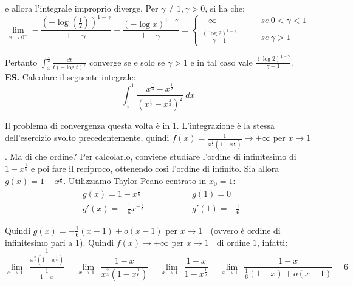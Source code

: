 \documentclass{article}
\begin{document}
\noindent e allora l'integrale improprio diverge. Per $\gamma \neq 1, \gamma > 0$, si ha che:
\begin{equation*}
    \lim_{x \to 0^+} - \frac{(-\log(\frac{1}{2}))^{1 - \gamma}}{1 - \gamma} + \frac{(-\log x)^{1 - \gamma}}{1 - \gamma} = \begin{cases}
        + \infty & \qquad se \ 0 < \gamma < 1 \\
        \frac{(\log 2)^{1 - \gamma}}{\gamma - 1} & \qquad se \ \gamma > 1
    \end{cases}
\end{equation*}

\noindent Pertanto $\int_x^\frac{1}{2} \frac{dt}{t(-\log t)^\gamma}$ converge se e solo se $\gamma > 1$ e in tal caso vale $\frac{(\log 2)^{1 - \gamma}}{\gamma - 1}$.\\

\noindent\textbf{ES.} Calcolare il seguente integrale:
\begin{equation*}
    \int_{\frac{1}{2}}^1 \frac{x^{\frac{1}{3}} - x^{\frac{1}{2}}}{(x^{\frac{1}{2}} - x^{\frac{2}{3}})^2} \ dx
\end{equation*}

\noindent Il problema di convergenza questa volta è in $1$. L'integrazione è la stessa dell'esercizio svolto precedentemente, quindi $f(x) = \frac{1}{x^{\frac{2}{3}} (1 - x^\frac{1}{6})} \to +\infty$ per $x \to 1$. Ma di che ordine? Per calcolarlo, conviene studiare l'ordine di infinitesimo di $1 - x^\frac{1}{6}$ e poi fare il reciproco, ottenendo così l'ordine di infinito. Sia allora $g(x) = 1 - x^\frac{1}{6}$. Utilizziamo Taylor-Peano centrato in $x_0 = 1$:
\begin{align*}
    & g(x) = 1 - x^\frac{1}{6} && \qquad \qquad g(1) = 0 \\
    & g'(x) = -\frac{1}{6} x^{-\frac{5}{6}} && \qquad \qquad g'(1) = -\frac{1}{6}
\end{align*}

\noindent Quindi $g(x) = -\frac{1}{6}(x - 1) + o(x - 1)$ per $x \to 1^-$ (ovvero è ordine di infinitesimo pari a $1$). Quindi $f(x) \to +\infty$ per $x \to 1^-$ di ordine $1$, infatti:
\begin{equation*}
    \lim_{x \to 1^-} \frac{\frac{1}{x^\frac{2}{3}(1 - x^\frac{1}{6})}}{\frac{1}{1 - x}} = \lim_{x \to 1^-} \frac{1 - x}{x^\frac{2}{3}(1 - x^\frac{1}{6})} = \lim_{x \to 1^-} \frac{1 - x}{1 - x^\frac{1}{6}} = \lim_{x \to 1^-} \frac{1 - x}{\frac{1}{6} (1 - x) + o(x - 1)} = 6
\end{equation*}
\end{document}
